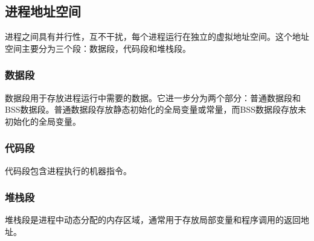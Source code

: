 \documentclass[12pt, a4paper, oneside]{ctexbook}
\numberwithin{figure}{section}
\begin{document}
\subsection{进程地址空间}
进程之间具有并行性，互不干扰，每个进程运行在独立的虚拟地址空间。这个地址空间主要分为三个段：数据段，代码段和堆栈段。

\subsubsection{数据段}
数据段用于存放进程运行中需要的数据。它进一步分为两个部分：普通数据段和BSS数据段。普通数据段存放静态初始化的全局变量或常量，而BSS数据段存放未初始化的全局变量。

\subsubsection{代码段}
代码段包含进程执行的机器指令。

\subsubsection{堆栈段}
堆栈段是进程中动态分配的内存区域，通常用于存放局部变量和程序调用的返回地址。
\end{document}
